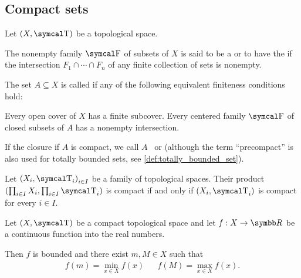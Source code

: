 \subsection{Compact sets}\label{subsec:compact_sets}

Let \( (X, \T) \) be a topological space.

\begin{definition}\label{def:centered_family}\cite[123]{Engelking1989}
  The nonempty family \( \F \) of subsets of \( X \) is said to be a  or to have the  if the intersection \( F_1 \cap \cdots \cap F_n \) of any finite collection of sets is nonempty.
\end{definition}

\begin{definition}\label{def:compact_set}\cite[123]{Engelking1989}
  The set \( A \subseteq X \) is called  if any of the following equivalent finiteness conditions hold:
  \begin{defenum}
     Every open cover of \( X \) has a finite subcover.
     Every centered family \( \F \) of closed subsets of \( A \) has a nonempty intersection.
  \end{defenum}

  If the closure if \( A \) is compact, we call \( A \)~ or  (although the term \enquote{precompact} is also used for totally bounded sets, see \ref{def:totally_bounded_set}).
\end{definition}

\begin{theorem}\label{thm:tychonoffs_product_theorem}\cite[theorem 3.2.4]{Engelking1989}
  Let \( { (X_i, \T_i) }_{i \in I} \) be a family of topological spaces. Their product \( (\prod_{i \in I} X_i, \prod_{i \in I} \T_i) \) is compact if and only if \( (X_i, \T_i) \) is compact for every \( i \in I \).

\end{theorem}

\begin{theorem}\label{thm:weierstrass_extreme_value_theorem}
  Let \( (X, \T) \) be a compact topological space and let \( f: X \to \R \) be a continuous function into the real numbers.

  Then \( f \) is bounded and there exist \( m, M \in X \) such that
  \begin{align*}
    f(m) = \min_{x \in X} f(x)
    &&
    f(M) = \max_{x \in X} f(x).
  \end{align*}
\end{theorem}
